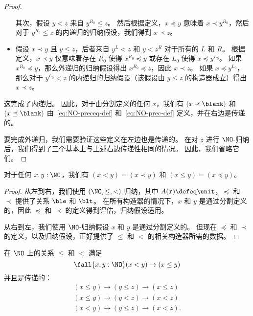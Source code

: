 \begin{proof}
\begin{itemize}
    其次，假设 $y<z$ 来自 $y^{R_0}\le z$。
    然后根据定义，$x\preceq y$ 意味着 $x\prec y^{R_0}$，然后对于 $y^{R_0}\le z$ 的内递归的归纳假设，我们得到 $x\prec z$。
    \item 假设 $x\prec y$ 且 $y\le z$，后者来自 $y^L<z$ 和 $y<z^R$ 对于所有的 $L$ 和 $R$。
    根据定义，$x\prec y$ 仅意味着存在 $R_0$ 使得 $x^{R_0}\preceq y$ 或存在 $L_0$ 使得 $x\preceq y^{L_0}$。
    如果 $x^{R_0}\preceq y$，那么外递归的归纳假设得出 $x^{R_0}\preceq z$，因此 $x\prec z$。
    如果 $x\preceq y^{L_0}$，那么对于 $y^{L_0}<z$ 的内递归的归纳假设（该假设由 $y\le z$ 的构造器成立）得出 $x\prec z$。
  \end{itemize}
  这完成了内递归。
  因此，对于由分割定义的任何 $x$，我们有 $(x\prec \blank)$ 和 $(x\preceq \blank)$ 由~\eqref{eq:NO-preceq-def} 和~\eqref{eq:NO-prec-def} 定义，并在右边是传递的。

  要完成外递归，我们需要验证这些定义在左边也是传递的。
  在对 $z$ 进行 $\NO$-归纳后，我们得到了三个基本上与上述右边传递性相同的情况。
  因此，我们省略它们。
\end{proof}

\begin{thm}\label{thm:NO-encode-decode}
对于任何 $x,y:\NO$，我们有 $(x<y)=(x\prec y)$ 和 $(x\le y)=(x\preceq y)$。
\end{thm}
\begin{proof}
  从左到右，我们使用 $(\NO,\le,<)$-归纳，其中 $A(x)\defeq\unit$，$\preceq$ 和 $\prec$ 提供了关系 $\ble$ 和 $\blt$。
  在所有构造器的情况下，$x$ 和 $y$ 是通过分割定义的，因此 $\preceq$ 和 $\prec$ 的定义得到评估，归纳假设适用。

  从右到左，我们使用 $\NO$-归纳假设 $x$ 和 $y$ 是通过分割定义的。
  但现在 $\preceq$ 和 $\prec$ 的定义，以及归纳假设，正好提供了 $\le$ 和 $<$ 的相关构造器所需的数据。
\end{proof}

\begin{cor}\label{thm:NO-unstrict-transitive}
在 $\NO$ 上的关系 $\le$ 和 $<$ 满足
\[ \fall{x,y:\NO} (x<y) \to (x\le y) \]
并且是传递的：
\begin{gather*}
(x\le y) \to (y\le z) \to (x\le z)\\
(x\le y) \to (y< z) \to (x< z)\\
(x< y) \to (y\le z) \to (x< z).
\end{gather*}
\end{cor}

